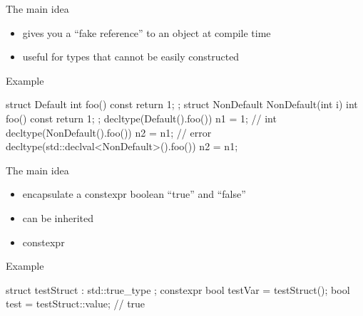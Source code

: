 \begin{frame}[fragile]
  \begin{block}{The main idea}
    \begin{itemize}
    \item gives you a ``fake reference'' to an object at compile time
    \item useful for types that cannot be easily constructed
    \end{itemize}
  \end{block}
  \begin{exampleblock}{Example}
    \begin{cppcode*}{}
      struct Default {
        int foo() const { return 1; }
      };
      struct NonDefault {
        NonDefault(int i) { }
        int foo() const { return 1; }
      };
      decltype(Default().foo()) n1 = 1;     // int
      decltype(NonDefault().foo()) n2 = n1; // error
      decltype(std::declval<NonDefault>().foo()) n2 = n1;
    \end{cppcode*}
  \end{exampleblock}
\end{frame}

\begin{frame}[fragile]
  \begin{block}{The main idea}
    \begin{itemize}
    \item encapsulate a constexpr boolean ``true'' and ``false''
    \item can be inherited
    \item constexpr
    \end{itemize}
  \end{block}
  \begin{exampleblock}{Example}
    \begin{cppcode*}{}
      struct testStruct : std::true_type { };
      constexpr bool testVar = testStruct();
      bool test = testStruct::value; // true
    \end{cppcode*}
  \end{exampleblock}
\end{frame}

